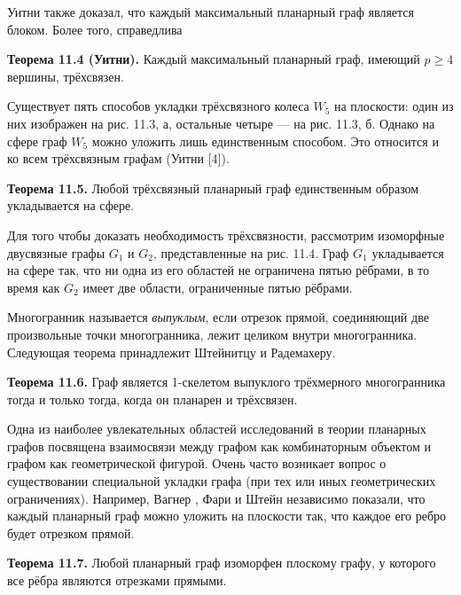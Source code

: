 Уитни также доказал, что каждый максимальный планарный граф является блоком. Более того, справедлива

\textbf{Теорема 11.4 (Уитни).} Каждый максимальный планарный граф, имеющий $p \geq 4$ вершины, трёхсвязен.

Существует пять способов укладки трёхсвязного колеса $W_5$ на плоскости: один из них изображен на рис. 11.3, а, остальные четыре — на рис. 11.3, б. Однако на сфере граф $W_5$ можно уложить лишь единственным способом. Это относится и ко всем трёхсвязным графам (Уитни [4]).


\textbf{Теорема 11.5.} Любой трёхсвязный планарный граф единственным образом укладывается на сфере.

Для того чтобы доказать необходимость трёхсвязности, рассмотрим изоморфные двусвязные графы $G_1$ и $G_2$, представленные на рис. 11.4. Граф $G_1$ укладывается на сфере так, что ни одна из его областей не ограничена пятью рёбрами, в то время как $G_2$ имеет две области, ограниченные пятью рёбрами.

Многогранник называется \textit{выпуклым}, если отрезок прямой, соединяющий две произвольные точки многогранника, лежит целиком внутри многогранника. Следующая теорема принадлежит Штейнитцу и Радемахеру.

\textbf{Теорема 11.6.} Граф является 1-скелетом выпуклого трёхмерного многогранника тогда и только тогда, когда он планарен и трёхсвязен.

Одна из наиболее увлекательных областей исследований в теории планарных графов посвящена взаимосвязи между графом как комбинаторным объектом и графом как геометрической фигурой. Очень часто возникает вопрос о существовании специальной укладки графа (при тех или иных геометрических ограничениях). Например, Вагнер \cite{1}, Фари \cite{1} и Штейн \cite{1} независимо показали, что каждый планарный граф можно уложить на плоскости так, что каждое его ребро будет отрезком прямой.

\textbf{Теорема 11.7.} Любой планарный граф изоморфен плоскому графу, у которого все рёбра являются отрезками прямыми.
